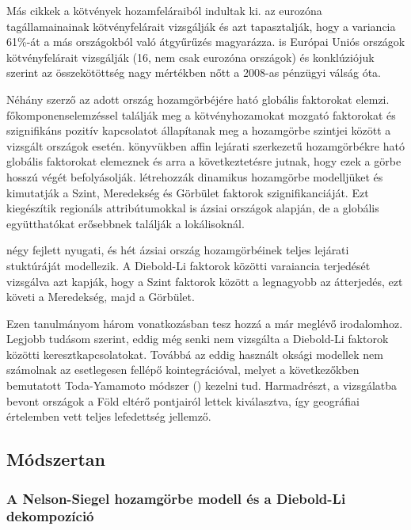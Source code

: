 \documentclass[12pt,bibliography=totoc]{article}
\begin{document}
Más cikkek a kötvények hozamfeláraiból indultak ki. 
\cite{antonakakis2013sovereign} az eurozóna tagállamainainak kötvényfelárait vizsgálják és azt tapasztalják, hogy a variancia 61\%-át a más országokból való átgyűrűzés magyarázza. 
\cite{claeys2014measuring} is Európai Uniós országok kötvényfelárait vizsgálják (16, nem csak eurozóna országok) és konklúziójuk szerint az összekötöttség nagy mértékben nőtt a 2008-as pénzügyi válság óta.

Néhány szerző az adott ország hozamgörbéjére ható globális faktorokat elemzi. \cite{driessen2003common} főkomponenselemzéssel találják meg a kötvényhozamokat mozgató faktorokat és szignifikáns pozitív kapcsolatot állapítanak meg a hozamgörbe szintjei között a vizsgált országok esetén.
\cite{abbritti2013global} könyvükben affin lejárati szerkezetű hozamgörbékre ható globális faktorokat elemeznek és arra a következtetésre jutnak, hogy ezek a görbe hosszú végét befolyásolják.
\cite{diebold2008global} létrehozzák dinamikus hozamgörbe modelljüket és kimutatják a Szint, Meredekség és Görbület faktorok szignifikanciáját.
Ezt \cite{bae2011global} kiegészítik regionáls attribútumokkal is ázsiai országok alapján, de a globális együtthatókat erősebbnek találják a lokálisoknál.

\cite{sowmya2016linkages} négy fejlett nyugati, és hét ázsiai ország hozamgörbéinek teljes lejárati stuktúráját modellezik. A Diebold-Li faktorok közötti varaiancia terjedését vizsgálva azt kapják, hogy a Szint faktorok között a legnagyobb az átterjedés, ezt követi a Meredekség, majd a Görbület.

Ezen tanulmányom három vonatkozásban tesz hozzá a már meglévő irodalomhoz. Legjobb tudásom szerint, eddig még senki nem vizsgálta a Diebold-Li faktorok közötti keresztkapcsolatokat. Továbbá az eddig használt oksági modellek nem számolnak az esetlegesen fellépő kointegrációval, melyet a következőkben bemutatott Toda-Yamamoto módszer (\cite{toda1995statistical}) kezelni tud. Harmadrészt, a vizsgálatba bevont országok a Föld eltérő pontjairól lettek kiválasztva, így geográfiai értelemben vett teljes lefedettség jellemző.

\bigskip



\subsection{Módszertan}
\noindent
\subsubsection{A Nelson-Siegel hozamgörbe modell és a Diebold-Li dekompozíció}
\end{document}
